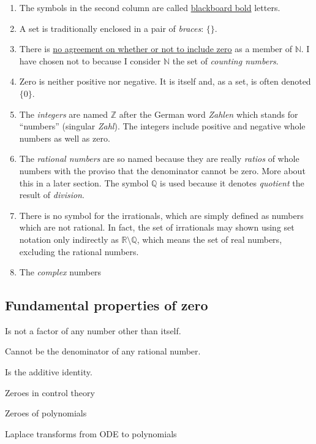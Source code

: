 \documentclass[
  a4paper,
]{article}
\begin{document}
\begin{enumerate}
\item
  The symbols in the second column are called
  \href{https://oeis.org/wiki/Blackboard_bold}{blackboard bold} letters.
\item
  A set is traditionally enclosed in a pair of \emph{braces}: \(\{\}\).
\item
  There is \href{https://en.wikipedia.org/wiki/Natural_number}{no
  agreement on whether or not to include zero} as a member of
  \(\mathbb{N}\). I have chosen not to because I consider \(\mathbb{N}\)
  the set of \emph{counting numbers}.
\item
  Zero is neither positive nor negative. It is itself and, as a set, is
  often denoted \(\{0\}\).
\item
  The \emph{integers} are named \(\mathbb{Z}\) after the German word
  \emph{Zahlen} which stands for ``numbers'' (singular \emph{Zahl}). The
  integers include positive and negative whole numbers as well as zero.
\item
  The \emph{rational numbers} are so named because they are really
  \emph{ratios} of whole numbers with the proviso that the denominator
  cannot be zero. More about this in a later section. The symbol
  \(\mathbb{Q}\) is used because it denotes \emph{quotient} the result
  of \emph{division}.
\item
  There is no symbol for the irrationals, which are simply defined as
  numbers which are not rational. In fact, the set of irrationals may
  shown using set notation only indirectly as
  \(\mathbb{R}\setminus\mathbb{Q}\), which means the set of real
  numbers, excluding the rational numbers.
\item
  The \emph{complex} numbers
\end{enumerate}

\hypertarget{fundamental-properties-of-zero}{%
\subsection{Fundamental properties of
zero}\label{fundamental-properties-of-zero}}

Is not a factor of any number other than itself.

Cannot be the denominator of any rational number.

Is the additive identity.

Zeroes in control theory

Zeroes of polynomials

Laplace transforms from ODE to polynomials
\end{document}

